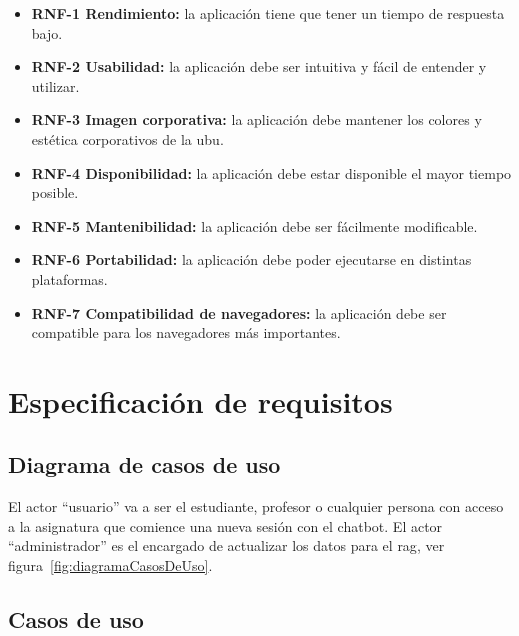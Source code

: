 \begin{itemize}
\item \textbf{RNF-1 Rendimiento:} la aplicación tiene que tener un tiempo de respuesta bajo.  
\item \textbf{RNF-2 Usabilidad:} la aplicación debe ser intuitiva y fácil de entender y utilizar.  
\item \textbf{RNF-3 Imagen corporativa:} la aplicación debe mantener los colores y estética corporativos de la \acrshort{ubu}.  
\item \textbf{RNF-4 Disponibilidad:} la aplicación debe estar disponible el mayor tiempo posible.
\item \textbf{RNF-5 Mantenibilidad:} la aplicación debe ser fácilmente modificable.
\item \textbf{RNF-6 Portabilidad:} la aplicación debe poder ejecutarse en distintas plataformas.
\item \textbf{RNF-7 Compatibilidad de navegadores:} la aplicación debe ser compatible para los navegadores más importantes.
\end{itemize}

\newpage
\section{Especificación de requisitos}

\subsection{Diagrama de casos de uso}


El actor ``usuario'' va a ser el estudiante, profesor o cualquier persona con acceso a la asignatura que comience una nueva sesión con el chatbot. El actor ``administrador'' es el encargado de actualizar los datos para el \acrshort{rag}, ver figura~\ref{fig:diagramaCasosDeUso}.

\newpage
\subsection{Casos de uso}

